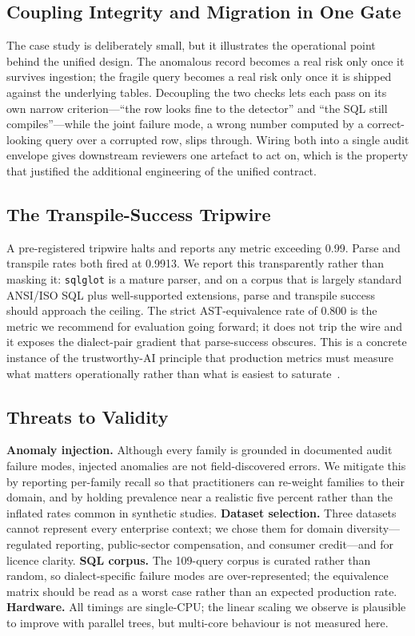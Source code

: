 \documentclass{ieeeaccess}
\begin{document}
\subsection{Coupling Integrity and Migration in One Gate}

The case study is deliberately small, but it illustrates the operational point
behind the unified design. The anomalous record becomes a real risk only once it
survives ingestion; the fragile query becomes a real risk only once it is shipped
against the underlying tables. Decoupling the two checks lets each pass on its own
narrow criterion---``the row looks fine to the detector'' and ``the SQL still
compiles''---while the joint failure mode, a wrong number computed by a
correct-looking query over a corrupted row, slips through. Wiring both into a
single audit envelope gives downstream reviewers one artefact to act on, which is
the property that justified the additional engineering of the unified contract.

\subsection{The Transpile-Success Tripwire}

A pre-registered tripwire halts and reports any metric exceeding 0.99. Parse and
transpile rates both fired at 0.9913. We report this transparently rather than
masking it: \texttt{sqlglot} is a mature parser, and on a corpus that is largely
standard ANSI/ISO SQL plus well-supported extensions, parse and transpile success
should approach the ceiling. The strict AST-equivalence rate of 0.800 is the
metric we recommend for evaluation going forward; it does not trip the wire and it
exposes the dialect-pair gradient that parse-success obscures. This is a concrete
instance of the trustworthy-AI principle that production metrics must measure what
matters operationally rather than what is easiest to
saturate~\cite{kaur2023trustworthy, li2023trustworthy}.

\subsection{Threats to Validity}

\textbf{Anomaly injection.} Although every family is grounded in documented audit
failure modes, injected anomalies are not field-discovered errors. We mitigate
this by reporting per-family recall so that practitioners can re-weight families
to their domain, and by holding prevalence near a realistic five percent rather
than the inflated rates common in synthetic studies.
\textbf{Dataset selection.} Three datasets cannot represent every enterprise
context; we chose them for domain diversity---regulated reporting, public-sector
compensation, and consumer credit---and for licence clarity.
\textbf{SQL corpus.} The 109-query corpus is curated rather than random, so
dialect-specific failure modes are over-represented; the equivalence matrix should
be read as a worst case rather than an expected production rate.
\textbf{Hardware.} All timings are single-CPU; the linear scaling we observe is
plausible to improve with parallel trees, but multi-core behaviour is not measured
here.
\end{document}
